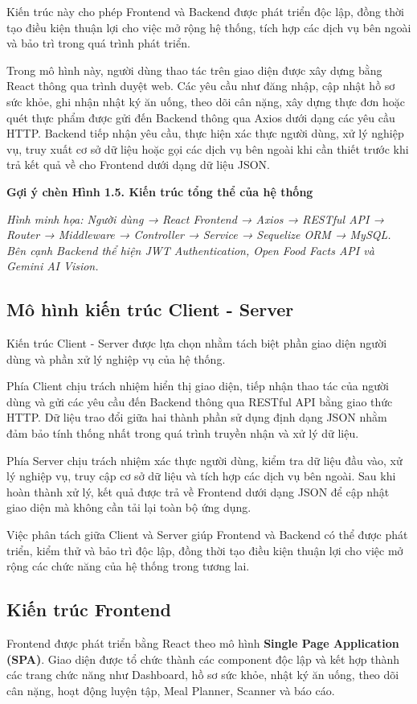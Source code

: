 \documentclass[12pt, a4paper]{report}
\begin{document}
Kiến trúc này cho phép Frontend và Backend được phát triển độc lập, đồng thời tạo điều kiện thuận lợi cho việc mở rộng hệ thống, tích hợp các dịch vụ bên ngoài và bảo trì trong quá trình phát triển.

Trong mô hình này, người dùng thao tác trên giao diện được xây dựng bằng React thông qua trình duyệt web. Các yêu cầu như đăng nhập, cập nhật hồ sơ sức khỏe, ghi nhận nhật ký ăn uống, theo dõi cân nặng, xây dựng thực đơn hoặc quét thực phẩm được gửi đến Backend thông qua Axios dưới dạng các yêu cầu HTTP. Backend tiếp nhận yêu cầu, thực hiện xác thực người dùng, xử lý nghiệp vụ, truy xuất cơ sở dữ liệu hoặc gọi các dịch vụ bên ngoài khi cần thiết trước khi trả kết quả về cho Frontend dưới dạng dữ liệu JSON.

\textbf{Gợi ý chèn Hình 1.5. Kiến trúc tổng thể của hệ thống}

\textit{Hình minh họa: Người dùng → React Frontend → Axios → RESTful API → Router → Middleware → Controller → Service → Sequelize ORM → MySQL. Bên cạnh Backend thể hiện JWT Authentication, Open Food Facts API và Gemini AI Vision.}

\subsection{Mô hình kiến trúc Client - Server}Kiến trúc Client - Server được lựa chọn nhằm tách biệt phần giao diện người dùng và phần xử lý nghiệp vụ của hệ thống.

Phía Client chịu trách nhiệm hiển thị giao diện, tiếp nhận thao tác của người dùng và gửi các yêu cầu đến Backend thông qua RESTful API bằng giao thức HTTP. Dữ liệu trao đổi giữa hai thành phần sử dụng định dạng JSON nhằm đảm bảo tính thống nhất trong quá trình truyền nhận và xử lý dữ liệu.

Phía Server chịu trách nhiệm xác thực người dùng, kiểm tra dữ liệu đầu vào, xử lý nghiệp vụ, truy cập cơ sở dữ liệu và tích hợp các dịch vụ bên ngoài. Sau khi hoàn thành xử lý, kết quả được trả về Frontend dưới dạng JSON để cập nhật giao diện mà không cần tải lại toàn bộ ứng dụng.

Việc phân tách giữa Client và Server giúp Frontend và Backend có thể được phát triển, kiểm thử và bảo trì độc lập, đồng thời tạo điều kiện thuận lợi cho việc mở rộng các chức năng của hệ thống trong tương lai.

\subsection{Kiến trúc Frontend}Frontend được phát triển bằng React theo mô hình \textbf{Single Page Application (SPA)}. Giao diện được tổ chức thành các component độc lập và kết hợp thành các trang chức năng như Dashboard, hồ sơ sức khỏe, nhật ký ăn uống, theo dõi cân nặng, hoạt động luyện tập, Meal Planner, Scanner và báo cáo.
\end{document}
